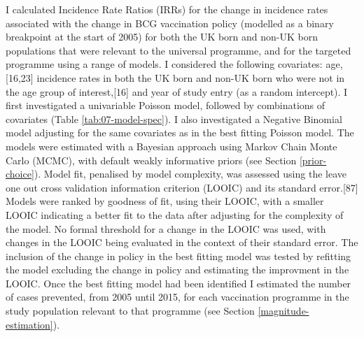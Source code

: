 \documentclass[11pt,twoside]{bristolthesis}
\begin{document}
  I calculated Incidence Rate Ratios (IRRs) for the change in incidence rates associated with the change in BCG vaccination policy (modelled as a binary breakpoint at the start of 2005) for both the UK born and non-UK born populations that were relevant to the universal programme, and for the targeted programme using a range of models. I considered the following covariates: age,{[}16,23{]} incidence rates in both the UK born and non-UK born who were not in the age group of interest,{[}16{]} and year of study entry (as a random intercept). I first investigated a univariable Poisson model, followed by combinations of covariates (Table \ref{tab:07-model-spec}). I also investigated a Negative Binomial model adjusting for the same covariates as in the best fitting Poisson model. The models were estimated with a Bayesian approach using Markov Chain Monte Carlo (MCMC), with default weakly informative priors (see Section \ref{prior-choice}). Model fit, penalised by model complexity, was assessed using the leave one out cross validation information criterion (LOOIC) and its standard error.{[}87{]} Models were ranked by goodness of fit, using their LOOIC, with a smaller LOOIC indicating a better fit to the data after adjusting for the complexity of the model. No formal threshold for a change in the LOOIC was used, with changes in the LOOIC being evaluated in the context of their standard error. The inclusion of the change in policy in the best fitting model was tested by refitting the model excluding the change in policy and estimating the improvment in the LOOIC. Once the best fitting model had been identified I estimated the number of cases prevented, from 2005 until 2015, for each vaccination programme in the study population relevant to that programme (see Section \ref{magnitude-estimation}).
\end{document}
